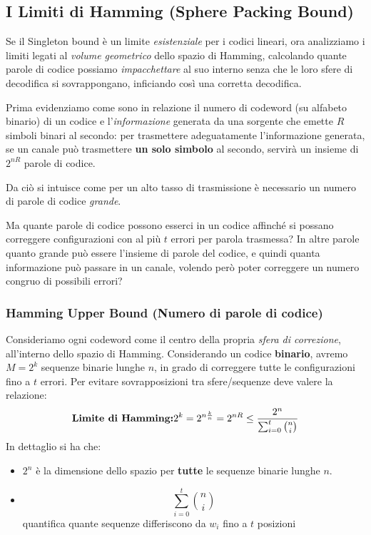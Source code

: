 \subsection{I Limiti di Hamming (Sphere Packing Bound)} %
Se il Singleton bound è un limite \textit{esistenziale} per i codici lineari, ora analizziamo i limiti legati al \textit{volume geometrico} dello spazio di Hamming, calcolando quante parole di codice possiamo \textit{impacchettare} al suo interno senza che le loro sfere di decodifica si sovrappongano, inficiando così una corretta decodifica.

Prima evidenziamo come sono in relazione il numero di codeword (su alfabeto binario) di un codice e l'\textit{informazione} generata da una sorgente che emette $R$ simboli binari al secondo:
per trasmettere adeguatamente l'informazione generata, se un canale può trasmettere \textbf{un solo simbolo} al secondo, servirà un insieme di $2^{nR}$ parole di codice.

Da ciò si intuisce come per un alto tasso di trasmissione è necessario un numero di parole di codice \textit{grande}.

Ma quante parole di codice possono esserci in un codice affinché si possano correggere configurazioni con al più $t$ errori per parola trasmessa?
In altre parole quanto grande può essere l'insieme di parole del codice, e quindi quanta informazione può passare in un canale, volendo però poter correggere un numero congruo di possibili errori?




\subsubsection{Hamming Upper Bound (Numero di parole di codice)} %
Consideriamo ogni codeword come il centro della propria \textit{sfera di correzione}, all'interno dello spazio di Hamming. Considerando un codice \textbf{binario}, avremo $M=2^k$ sequenze binarie lunghe $n$, in grado di correggere tutte le configurazioni fino a $t$ errori. Per evitare sovrapposizioni tra sfere/sequenze deve valere la relazione:
\[\textbf{Limite di Hamming:} \space 2^k= 2^{n\frac{k}{n}}=2^{nR} \leq \frac{2^n}{\sum_{i=0}^t\binom{n}{i}}\]
In dettaglio si ha che:
\begin{itemize}
\item $2^n$ è la dimensione dello spazio per \textbf{tutte} le sequenze binarie lunghe $n$.
\item $$\sum_{i=0}^t\binom{n}{i}$$ quantifica quante sequenze differiscono da $w_i$ fino a $t$ posizioni
\end{itemize}

